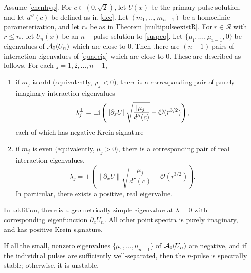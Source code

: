 \documentclass[thesis.tex]{subfiles}
\begin{document}
\begin{theorem}\label{chenstab}
Assume \cref{chenhyp}. For $c \in (0, \sqrt{2})$, let $U(x)$ be the primary pulse solution, and let $d''(c)$ be defined as in \cref{dcc}. Let $(m_1, \dots, m_{n-1})$ be a homoclinic parameterization, and let $r_*$ be as in Theorem \ref{multipulseexistR}. For $r \in \mathcal{R}$ with $r \leq r_*$, let $U_n(x)$ be an $n-$pulse solution to \cref{suspeq}. Let $\{\mu_1, \dots, \mu_{n-1}, 0\}$ be eigenvalues of $\mathcal{A}_0(U_n)$ which are close to 0. Then there are $(n-1)$ pairs of interaction eigenvalues of \cref{quadeig} which are close to 0. These are described as follows. For each $j=1,2,\dots,n-1$,
\begin{enumerate}
  \item if $m_j$ is odd (equivalently, $\mu_j<0$), there is a corresponding pair of purely imaginary interaction eigenvalues,
  \begin{equation}\label{npulseKreineigs}
	\lambda_j^\pm = \pm \mathrm{i} \left( \|\partial_xU\| \sqrt{ \frac{|\mu_j|}{d''(c)} } + \mathcal{O}(r^{3/2}) \right),
	\end{equation}
  each of which has negative Krein signature
  \item if $m_j$ is even (equivalently, $\mu_j>0$), there is a corresponding pair of real interaction eigenvalues,
   	\[
	\lambda_j = \pm \left( \|\partial_xU\| \sqrt{ \frac{\mu_j}{d''(c)} } + \mathcal{O}(r^{3/2}) \right).
	\]
  In particular, there exists a positive, real eigenvalue.
\end{enumerate}
In addition, there is a geometrically simple eigenvalue at $\lambda=0$ with corresponding eigenfunction $\partial_x U_n$. All other point spectra is purely imaginary, and has positive Krein signature.
\end{theorem}

\begin{remark}
If all the small, nonzero eigenvalues $\{ \mu_1, \dots, \mu_{n-1} \}$ of $\mathcal{A}_0(U_n)$ are negative, and if the individual pulses are sufficiently well-separated, then the $n$-pulse is spectrally stable; otherwise, it is unstable.
\end{remark}
\end{document}
